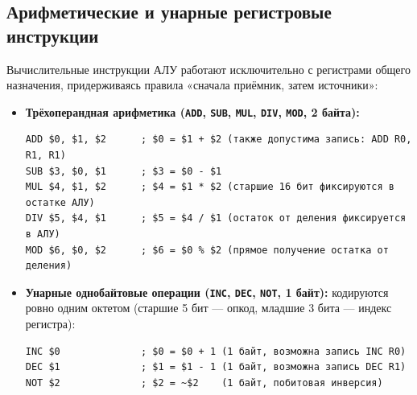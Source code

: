 \documentclass[11pt,a4paper]{article}
\begin{document}
\subsection{Арифметические и унарные регистровые инструкции}
Вычислительные инструкции АЛУ работают исключительно с регистрами общего назначения, придерживаясь правила «сначала приёмник, затем источники»:
\begin{itemize}
  \item \textbf{Трёхоперандная арифметика (\texttt{ADD}, \texttt{SUB}, \texttt{MUL}, \texttt{DIV}, \texttt{MOD}, 2 байта):}
\begin{verbatim}
ADD $0, $1, $2      ; $0 = $1 + $2 (также допустима запись: ADD R0, R1, R1)
SUB $3, $0, $1      ; $3 = $0 - $1
MUL $4, $1, $2      ; $4 = $1 * $2 (старшие 16 бит фиксируются в остатке АЛУ)
DIV $5, $4, $1      ; $5 = $4 / $1 (остаток от деления фиксируется в АЛУ)
MOD $6, $0, $2      ; $6 = $0 % $2 (прямое получение остатка от деления)
\end{verbatim}
  \item \textbf{Унарные однобайтовые операции (\texttt{INC}, \texttt{DEC}, \texttt{NOT}, 1 байт):} кодируются ровно одним октетом (старшие 5 бит --- опкод, младшие 3 бита --- индекс регистра):
\begin{verbatim}
INC $0              ; $0 = $0 + 1 (1 байт, возможна запись INC R0)
DEC $1              ; $1 = $1 - 1 (1 байт, возможна запись DEC R1)
NOT $2              ; $2 = ~$2    (1 байт, побитовая инверсия)
\end{verbatim}
\end{itemize}
\end{document}
